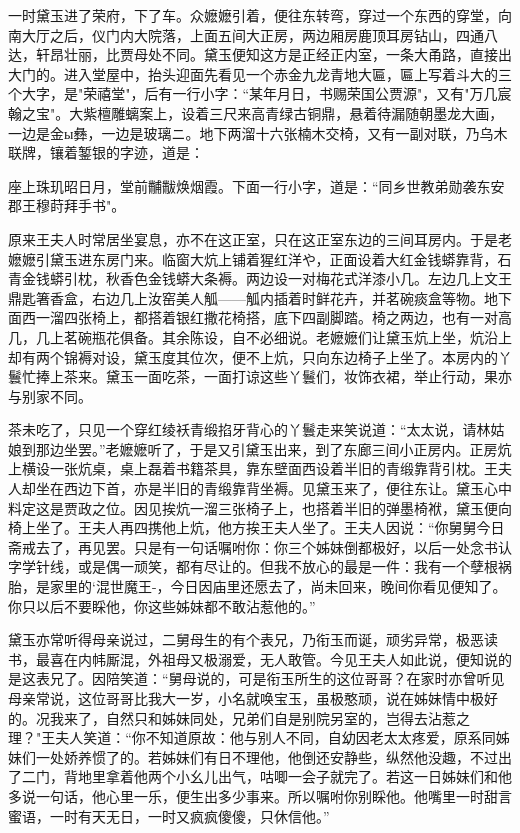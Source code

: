一时黛玉进了荣府，下了车。众嬷嬷引着，便往东转弯，穿过一个东西的穿堂，向南大厅之后，仪门内大院落，上面五间大正房，两边厢房鹿顶耳房钻山，四通八达，轩昂壮丽，比贾母处不同。黛玉便知这方是正经正内室，一条大甬路，直接出大门的。进入堂屋中，抬头迎面先看见一个赤金九龙青地大匾，匾上写着斗大的三个大字，是"荣禧堂"，后有一行小字：“某年月日，书赐荣国公贾源"，又有"万几宸翰之宝"。大紫檀雕螭案上，设着三尺来高青绿古铜鼎，悬着待漏随朝墨龙大画，一边是金ы彝，一边是玻璃ニ。地下两溜十六张楠木交椅，又有一副对联，乃乌木联牌，镶着錾银的字迹，道是：

座上珠玑昭日月，堂前黼黻焕烟霞。下面一行小字，道是：“同乡世教弟勋袭东安郡王穆莳拜手书"。

原来王夫人时常居坐宴息，亦不在这正室，只在这正室东边的三间耳房内。于是老嬷嬷引黛玉进东房门来。临窗大炕上铺着猩红洋や，正面设着大红金钱蟒靠背，石青金钱蟒引枕，秋香色金钱蟒大条褥。两边设一对梅花式洋漆小几。左边几上文王鼎匙箸香盒，右边几上汝窑美人觚——觚内插着时鲜花卉，并茗碗痰盒等物。地下面西一溜四张椅上，都搭着银红撒花椅搭，底下四副脚踏。椅之两边，也有一对高几，几上茗碗瓶花俱备。其余陈设，自不必细说。老嬷嬷们让黛玉炕上坐，炕沿上却有两个锦褥对设，黛玉度其位次，便不上炕，只向东边椅子上坐了。本房内的丫鬟忙捧上茶来。黛玉一面吃茶，一面打谅这些丫鬟们，妆饰衣裙，举止行动，果亦与别家不同。

茶未吃了，只见一个穿红绫袄青缎掐牙背心的丫鬟走来笑说道：“太太说，请林姑娘到那边坐罢。”老嬷嬷听了，于是又引黛玉出来，到了东廊三间小正房内。正房炕上横设一张炕桌，桌上磊着书籍茶具，靠东壁面西设着半旧的青缎靠背引枕。王夫人却坐在西边下首，亦是半旧的青缎靠背坐褥。见黛玉来了，便往东让。黛玉心中料定这是贾政之位。因见挨炕一溜三张椅子上，也搭着半旧的弹墨椅袱，黛玉便向椅上坐了。王夫人再四携他上炕，他方挨王夫人坐了。王夫人因说：“你舅舅今日斋戒去了，再见罢。只是有一句话嘱咐你：你三个姊妹倒都极好，以后一处念书认字学针线，或是偶一顽笑，都有尽让的。但我不放心的最是一件：我有一个孽根祸胎，是家里的`混世魔王-，今日因庙里还愿去了，尚未回来，晚间你看见便知了。你只以后不要睬他，你这些姊妹都不敢沾惹他的。”

黛玉亦常听得母亲说过，二舅母生的有个表兄，乃衔玉而诞，顽劣异常，极恶读书，最喜在内帏厮混，外祖母又极溺爱，无人敢管。今见王夫人如此说，便知说的是这表兄了。因陪笑道：“舅母说的，可是衔玉所生的这位哥哥？在家时亦曾听见母亲常说，这位哥哥比我大一岁，小名就唤宝玉，虽极憨顽，说在姊妹情中极好的。况我来了，自然只和姊妹同处，兄弟们自是别院另室的，岂得去沾惹之理？"王夫人笑道：“你不知道原故：他与别人不同，自幼因老太太疼爱，原系同姊妹们一处娇养惯了的。若姊妹们有日不理他，他倒还安静些，纵然他没趣，不过出了二门，背地里拿着他两个小幺儿出气，咕唧一会子就完了。若这一日姊妹们和他多说一句话，他心里一乐，便生出多少事来。所以嘱咐你别睬他。他嘴里一时甜言蜜语，一时有天无日，一时又疯疯傻傻，只休信他。”

